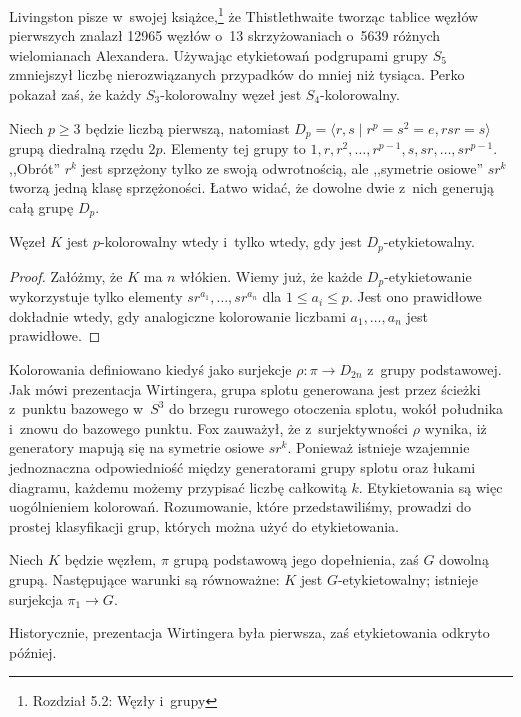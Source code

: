 Livingston pisze w~swojej książce,\footnote{Rozdział 5.2: Węzły i~grupy} że Thistlethwaite tworząc tablice węzłów pierwszych znalazł 12965 węzłów o~13 skrzyżowaniach o~5639 różnych wielomianach Alexandera.
Używając etykietowań podgrupami grupy $S_5$ zmniejszył liczbę nierozwiązanych przypadków do mniej niż tysiąca.
Perko pokazał zaś, że każdy $S_3$-kolorowalny węzeł jest $S_4$-kolorowalny.

Niech $p \ge 3$ będzie liczbą pierwszą, natomiast $D_p = \langle r, s \mid r^p = s^2 = e, rsr = s \rangle$ grupą diedralną rzędu $2p$.
Elementy tej grupy to $1, r, r^2, \ldots, r^{p-1}, s, sr, \ldots, sr^{p-1}$.
,,Obrót'' $r^k$ jest sprzężony tylko ze swoją odwrotnością, ale ,,symetrie osiowe'' $sr^k$ tworzą jedną klasę sprzężoności.
Łatwo widać, że dowolne dwie z~nich generują całą grupę $D_p$.

\begin{proposition}
    Węzeł $K$ jest $p$-kolorowalny wtedy i~tylko wtedy, gdy jest $D_p$-etykietowalny.
\end{proposition}

\begin{proof}
    Załóżmy, że $K$ ma $n$ włókien.
    Wiemy już, że każde $D_p$-etykietowanie wykorzystuje tylko elementy $sr^{a_1}, \ldots, sr^{a_n}$ dla $1 \le a_i \le p$.
    Jest ono prawidłowe dokładnie wtedy, gdy analogiczne kolorowanie liczbami $a_1, \ldots, a_n$ jest prawidłowe.
\end{proof}

Kolorowania definiowano kiedyś jako surjekcje $\rho \colon \pi \to D_{2n}$ z~grupy podstawowej.
Jak mówi prezentacja Wirtingera, grupa splotu generowana jest przez ścieżki z~punktu bazowego w~$S^3$ do brzegu rurowego otoczenia splotu, wokół południka i~znowu do bazowego punktu.
Fox zauważył, że z~surjektywności $\rho$ wynika, iż generatory mapują się na symetrie osiowe $sr^k$.
Ponieważ istnieje wzajemnie jednoznaczna odpowiedniość między generatorami grupy splotu oraz łukami diagramu, każdemu możemy przypisać liczbę całkowitą $k$.
Etykietowania są więc uogólnieniem kolorowań.
Rozumowanie, które przedstawiliśmy, prowadzi do prostej klasyfikacji grup, których można użyć do etykietowania.

\begin{proposition}
    Niech $K$ będzie węzłem, $\pi$ grupą podstawową jego dopełnienia, zaś $G$ dowolną grupą.
    Następujące warunki są równoważne: $K$ jest $G$-etykietowalny; istnieje surjekcja $\pi_1 \to G$.
\end{proposition}

Historycznie, prezentacja Wirtingera była pierwsza, zaś etykietowania odkryto później.

